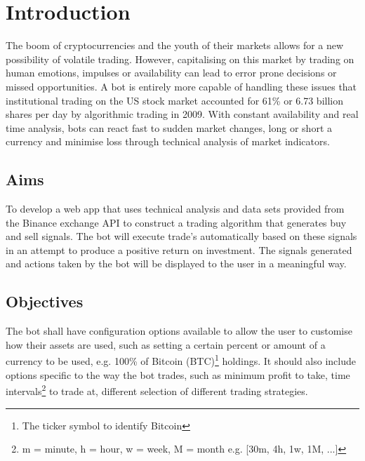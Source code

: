 
\chapter{Introduction}
\label{sec:intro}


The boom of cryptocurrencies and the youth of their markets allows for a new possibility of volatile trading. However, capitalising on this market by trading on human emotions, impulses or availability can lead to error prone decisions or missed opportunities. A bot is entirely more capable of handling these issues that institutional trading on the US stock market accounted for 61\% or 6.73 billion shares \cite{WEB:Cheng:2017} per day by algorithmic trading in 2009. With constant availability and real time analysis, bots can react fast to sudden market changes, long or short a currency and minimise loss through technical analysis of market indicators. \par






\section{Aims}
\label{sec:intro:aims}
To develop a web app that uses technical analysis and data sets provided from the Binance exchange API \cite{WEB:BINANCE_API:2018} to construct a trading algorithm that generates buy and sell signals. The bot will execute trade's automatically based on these signals in an attempt to produce a positive return on investment. The signals generated and actions taken by the bot will be displayed to the user in a meaningful way.


\section{Objectives}
\label{sec:intro:objectives}
The bot shall have configuration options available to allow the user to customise how their assets are used, such as setting a certain percent or amount of a currency to be used, e.g. 100\% of Bitcoin (BTC)\footnote{The ticker symbol to identify Bitcoin} holdings. It should also include options specific to the way the bot trades, such as minimum profit to take, time intervals\footnote{m = minute, h = hour, w = week, M = month e.g. [30m, 4h, 1w, 1M, ...]} to trade at, different selection of different trading strategies.

